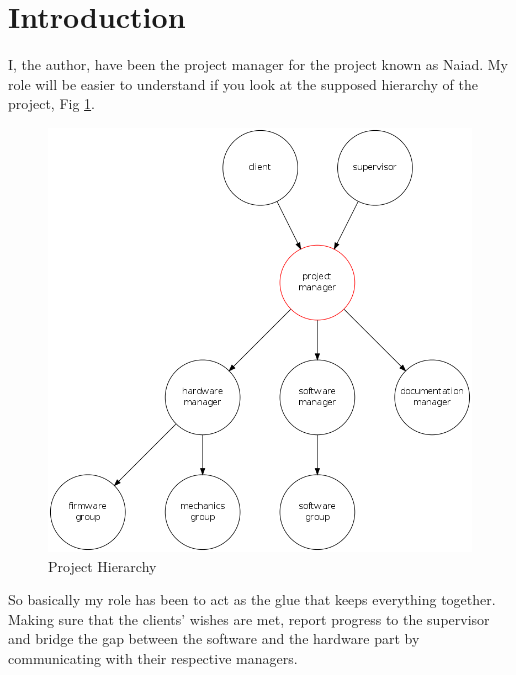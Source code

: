 \section{Introduction}\label{sec:introduction}
I, the author, have been the project manager for the project known as Naiad. My role will be easier to understand if you look at the supposed hierarchy of the project, Fig \ref{fig:hierarchy}.

\begin{figure}[!ht]
\begin{center} 
\includegraphics[scale=0.32]{figure/hierarchy.png} \caption{Project Hierarchy} 
\label{fig:hierarchy} 
\end{center} 
\end{figure}

So basically my role has been to act as the glue that keeps everything together. Making sure that the clients' wishes are met, report progress to the supervisor and bridge the gap between the software and  the hardware part by communicating with their respective managers.